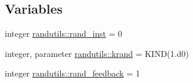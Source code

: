 \subsection*{Variables}
\begin{DoxyCompactItemize}
\item 
integer \mbox{\hyperlink{namespacerandutils_aaf067b67d4f4be83b834ee102bdd6a22}{randutils\+::rand\+\_\+inst}} = 0
\item 
integer, parameter \mbox{\hyperlink{namespacerandutils_a4a902df9abe9715fa91cccf15f4cfb2f}{randutils\+::krand}} = K\+I\+ND(1.d0)
\item 
integer \mbox{\hyperlink{namespacerandutils_acbcf68b5e32d0ef96da88ca3de39a454}{randutils\+::rand\+\_\+feedback}} = 1
\end{DoxyCompactItemize}
